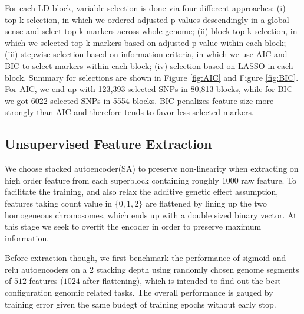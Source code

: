 \documentclass[acmtog, authorversion]{acmart}
\begin{document}
For each LD block, variable selection is done via four different approaches: (i) top-k selection, in which we ordered adjusted p-values descendingly in a global sense and select top k markers across whole genome; (ii) block-top-k selection, in which we selected top-k markers based on adjusted p-value within each block; (iii) stepwise selection based on information criteria, in which we use AIC and BIC to select markers within each block; (iv) selection based on LASSO in each block. Summary for selections are shown in Figure \ref{fig:AIC} and Figure {\ref{fig:BIC}}. For AIC, we end up with 123,393 selected SNPs in 80,813 blocks, while for BIC we got 6022 selected SNPs in 5554 blocks. BIC penalizes feature size more strongly than AIC and therefore tends to favor less selected markers. 



\subsection{Unsupervised Feature Extraction}
We choose stacked autoencoder(SA) \cite{DL:SDA1} to preserve non-linearity when extracting on high order feature from each superblock containing roughly 1000 raw feature. To facilitate the training, and also relax the additive genetic effect assumption, features taking count value in $\{0, 1, 2\}$ are flattened by lining up the two homogeneous chromosomes, which ends up with a double sized binary vector. At this stage we seek to overfit the encoder in order to preserve maximum information.

Before extraction though, we first benchmark the performance of sigmoid and relu autoencoders on a 2 stacking depth using randomly chosen genome segments of $512$ features ($1024$ after flattening), which is intended to find out the best configuration genomic related tasks. The overall performance is gauged by training error given the same budegt of training epochs without early stop.
\end{document}
